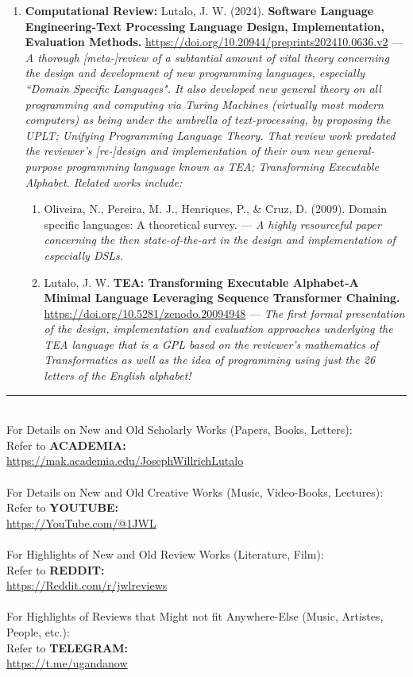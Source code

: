 \documentclass[a4paper]{article}
\begin{document}
\begin{enumerate}
{}

\item { \textbf{Computational Review:} Lutalo, J. W. (2024). \textbf{Software Language Engineering-Text Processing Language Design, Implementation, Evaluation Methods.} \url{https://doi.org/10.20944/preprints202410.0636.v2} --- \textit{A thorough [meta-]review of a subtantial amount of vital theory concerning the design and development of new programming languages, especially ``Domain Specific Languages". It also developed new general theory on all programming and computing via Turing Machines (virtually most modern computers) as being under the umbrella of text-processing, by proposing the UPLT; Unifying Programming Language Theory. That review work predated the reviewer's [re-]design and implementation of their own new general-purpose programming language known as TEA; Transforming Executable Alphabet. Related works include:}

\begin{enumerate}
\item Oliveira, N., Pereira, M. J., Henriques, P., \& Cruz, D. (2009). Domain specific languages: A theoretical survey. --- \textit{A highly resourceful paper concerning the then state-of-the-art in the design and implementation of especially DSLs.}
\item Lutalo, J. W. \textbf{TEA: Transforming Executable Alphabet-A Minimal Language Leveraging Sequence Transformer Chaining.} \url{https://doi.org/10.5281/zenodo.20094948} --- \textit{The first formal presentation of the design, implementation and evaluation approaches underlying the TEA language that is a GPL based on the reviewer's mathematics of Transformatics as well as the idea of programming using just the 26 letters of the English alphabet!}
\end{enumerate}

}

\end{enumerate}



\noindent\rule{\textwidth}{0.4pt}
\\
For Details on New and Old Scholarly Works (Papers, Books, Letters):\\Refer to \textbf{ACADEMIA:}\\ \url{https://mak.academia.edu/JosephWillrichLutalo}
\\\\
For Details on New and Old Creative Works (Music, Video-Books, Lectures):\\Refer to \textbf{YOUTUBE:}\\ \url{https://YouTube.com/@1JWL}
\\\\
For Highlights of New and Old Review Works (Literature, Film):\\Refer to \textbf{REDDIT:}\\ \url{https://Reddit.com/r/jwlreviews}
\\\\
For Highlights of Reviews that Might not fit Anywhere-Else  (Music, Artistes, People, etc.):\\Refer to \textbf{TELEGRAM:}\\ \url{https://t.me/ugandanow}
\end{document}
